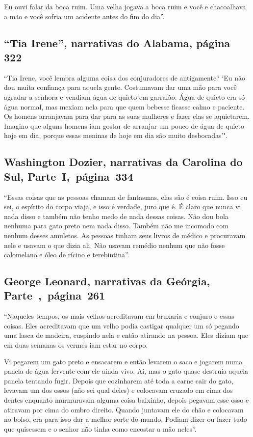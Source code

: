 Eu ouvi falar da boca ruim. Uma velha jogava a boca ruim e você e
chacoalhava a mão e você sofria um acidente antes do fim do dia''. %

\subsection{``Tia Irene'', narrativas do Alabama, página 322}

``Tia Irene, você lembra alguma coisa dos conjuradores de antigamente?
`Eu não dou muita confiança para aquela gente. Costumavam dar uma mão
para você agradar a senhora e vendiam água de quieto em garrafão. Água
de quieto era só água normal, mas mexiam nela para que quem bebesse
ficasse calmo e paciente. Os homens arranjavam para dar para as suas
mulheres e fazer elas se aquietarem. Imagino que alguns homens iam
gostar de arranjar um pouco de água de quieto hoje em dia, porque essas
meninas de hoje em dia são muito desbocadas'".

\subsection{Washington Dozier, narrativas da Carolina do Sul, Parte~I,~página~334} \label{ref76}

``Essas coisas que as pessoas chamam de fantasmas, elas são é coisa
ruim. Isso eu sei, o espírito do corpo viaja, e isso é verdade, juro que
é. É claro que nunca vi nada disso e também não tenho medo de nada
dessas coisas. Não dou bola nenhuma para gato preto nem nada disso.
Também não me incomodo com nenhum desses amuletos. As pessoas tinham
seus livros de médico e procuravam nele e usavam o que dizia ali. Não
usavam remédio nenhum que não fosse calomelano e óleo de rícino e
terebintina''.

\subsection{George Leonard, narrativas da Geórgia, Parte~,~página~261}
\label{ref169}

``Naqueles tempos, os mais velhos acreditavam em bruxaria e conjuro e
essas coisas. Eles acreditavam que um velho podia castigar qualquer um
só pegando uma lasca de madeira, cuspindo nela e então atirando na
pessoa. Eles diziam que em duas semanas os vermes iam estar no corpo.

Vi pegarem um gato preto e ensacarem e então levarem o saco e jogarem
numa panela de água fervente com ele ainda vivo. Ai, mas o gato quase
destruía aquela panela tentando fugir. Depois que cozinharem até toda a
carne cair do gato, levavam um dos ossos (não sei qual deles) e
colocavam cruzado em cima dos dentes enquanto murmuravam alguma coisa
baixinho, depois pegavam esse osso e atiravam por cima do ombro direito.
Quando juntavam ele do chão e colocavam no bolso, era para isso dar a
melhor sorte do mundo. Podiam dizer ou fazer tudo que quisessem e o
senhor não tinha como encostar a mão neles''.

